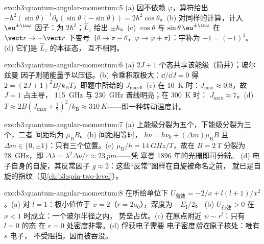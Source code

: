\begin{solution}{exo:b3:quantum-angular-momentum:5}
(a) 因不依赖 $\varphi$，算符给出
$-\hbar^2(\sin\theta)^{-1}\partial_\theta(\sin\theta\,(-\sin\theta))
= 2\hbar^2\cos\theta$。(b) 对同样的计算，计入
$\eu^{\pm\iu\varphi}$ 因子：为 $2\hbar^2$；$\hat L_z$
给出 $\pm\hbar$。(c) $\cos\theta$ 与 $\sin\theta\,\eu^{\pm\iu
\varphi}$ 在 $\vect r \to -\vect r$ 下变号（$\theta \to \pi
- \theta$，$\varphi \to \varphi + \pi$）：宇称为 $-1 = (-1)^1$。(d)
它们是 $\hat L_z$ 的本征态，
互不相同。
\end{solution}

\begin{solution}{exo:b3:quantum-angular-momentum:6}
(a) $2J + 1$ 个态共享该能级（简并）；玻尔兹曼
因子则随能量予以压低。(b) 令乘积取极大：$\dd/\dd J = 0$
得 $2 = (2J+1)^2B/k_{\text{B}}T$，即题中所给的 $J_{\max}$。(c) 在
\qty{10}{K} 时：$J_{\max} \approx 0.8$，故 $J = 1$ 占主导，
\qty{115}{GHz} 与 \qty{230}{GHz} 谱线明亮；在 \qty{300}{K} 时：
$J_{\max} \approx 7$。(d) $T \approx 2B(J_{\max} + \tfrac12)^2/
k_{\text{B}} \approx \qty{310}{K}$——即一种转动温度计。
\end{solution}

\begin{solution}{exo:b3:quantum-angular-momentum:7}
(a) 上能级分裂为五个，下能级分裂为三个，二者
间距均为 $\mu_{\text{B}}B$。(b) 间距相等时，
$h\nu = h\nu_0 + (\Delta m)\mu_{\text{B}}B$ 且 $\Delta m \in \{0,
\pm1\}$：只有三个位置。(c) $\mu_{\text{B}}/h = \qty{14}{GHz/T}$，故在 $B = \qty{2}{T}$
分裂为 \qty{28}{GHz}，即 $\Delta\lambda =
\lambda^2\Delta\nu/c \approx \qty{23}{pm}$——凭
塞曼 1896 年的光栅即可分辨。
(d) 电子自身的自旋，其反常因子 $g \approx
2$：这些“反常”图样在自旋被命名之前，
就已是自旋的指纹（见\cref{ch:b3:spin-two-level}）。
\end{solution}

\begin{solution}{exo:b3:quantum-angular-momentum:8}
在所给单位下 $U_{\text{有效}} = -2/x + l(l+1)/x^2$。(a) 对
$l = 1$：极小值位于 $x = 2$（$r = 2a_0$），深度为 $-E_{\text{I}}/2$。
(b) $U_{\text{有效}} > 0$ 在 $x < 1$ 时成立：一个玻尔半径之内，
势垒占优。(c) 在原点附近 $\psi \sim r^l$：只有 $l = 0$ 的态
在 $r = 0$ 处密度非零。(d) 俘获电子需要
电子密度\emph{恰在}原子核处：唯有 $s$ 电子，
不受阻挡，因而被吞没。
\end{solution}

